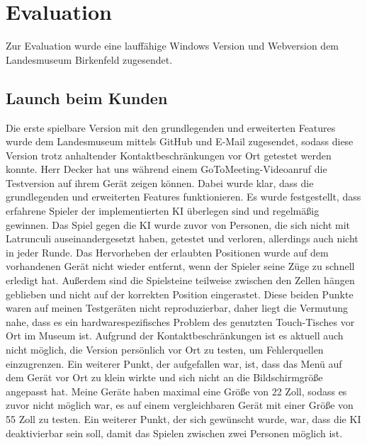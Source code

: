 
\chapter{Evaluation}
\label{ch:Evaluierung}
Zur Evaluation wurde eine lauffähige Windows Version und Webversion dem Landesmuseum Birkenfeld zugesendet.

\section{Launch beim Kunden}
\label{ch:Evaluierung:sec:Launch}
Die erste spielbare Version mit den grundlegenden und erweiterten Features wurde dem Landesmuseum mittels GitHub und E-Mail zugesendet, sodass diese Version trotz anhaltender Kontaktbeschränkungen vor Ort getestet werden konnte. Herr Decker hat uns während einem GoToMeeting-Videoanruf die Testversion auf ihrem Gerät zeigen können. Dabei wurde klar, dass die grundlegenden und erweiterten Features funktionieren. Es wurde festgestellt, dass erfahrene Spieler der implementierten KI überlegen sind und regelmäßig gewinnen. Das Spiel gegen die KI wurde zuvor von Personen, die sich nicht mit Latrunculi auseinandergesetzt haben, getestet und verloren, allerdings auch nicht in jeder Runde. Das Hervorheben der erlaubten Positionen wurde auf dem vorhandenen Gerät nicht wieder entfernt, wenn der Spieler seine Züge zu schnell erledigt hat. Außerdem sind die Spielsteine teilweise zwischen den Zellen hängen geblieben und nicht auf der korrekten Position eingerastet. Diese beiden Punkte waren auf meinen Testgeräten nicht reproduzierbar, daher liegt die Vermutung nahe, dass es ein hardwarespezifisches Problem des genutzten Touch-Tisches vor Ort im Museum ist. Aufgrund der Kontaktbeschränkungen ist es aktuell auch nicht möglich, die Version persönlich vor Ort zu testen, um Fehlerquellen einzugrenzen. Ein weiterer Punkt, der aufgefallen war, ist, dass das Menü auf dem Gerät vor Ort zu klein wirkte und sich nicht an die Bildschirmgröße angepasst hat. Meine Geräte haben maximal eine Größe von 22 Zoll, sodass es zuvor nicht möglich war, es auf einem vergleichbaren Gerät mit einer Größe von 55 Zoll zu testen.
Ein weiterer Punkt, der sich gewünscht wurde, war, dass die KI deaktivierbar sein soll, damit das Spielen zwischen zwei Personen möglich ist.

